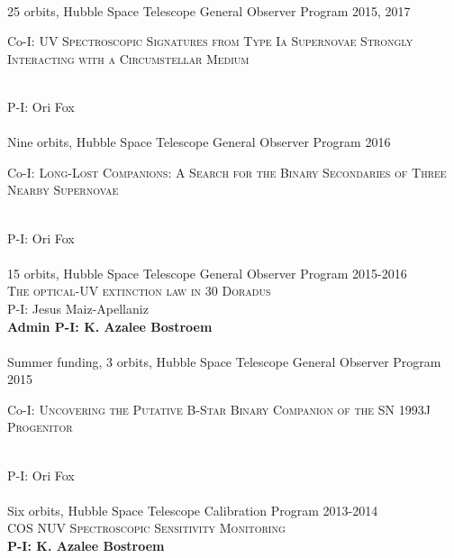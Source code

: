 \documentclass[10pt]{cv}
\begin{document}
\begin{llist}
\\
25 orbits, Hubble Space Telescope General Observer Program \hfill 2015, 2017\\ %
\begin{minipage}[l]{0.7\textwidth}\vspace{0.15cm}
Co-I: \textsc{UV Spectroscopic Signatures from Type Ia Supernovae Strongly Interacting with a Circumstellar Medium}
\end{minipage}\vspace{0.15cm}\\
P-I: Ori Fox \\
\\
Nine orbits, Hubble Space Telescope General Observer Program \hfill 2016\\ %
\begin{minipage}[l]{0.7\textwidth}\vspace{0.15cm}
Co-I: \textsc{Long-Lost Companions: A Search for the Binary Secondaries of Three Nearby Supernovae}
\end{minipage}\vspace{0.15cm}\\
P-I: Ori Fox \\
\\
15 orbits, Hubble Space Telescope General Observer Program \hfill 2015-2016\\ %
\textsc{The optical-UV extinction law in 30 Doradus}\\
P-I: Jesus Maiz-Apellaniz \\
{\bf Admin P-I: K. Azalee Bostroem} \\
\\
Summer funding, 3 orbits, Hubble Space Telescope General Observer Program \hfill 2015\\ %
\begin{minipage}[l]{0.7\textwidth}\vspace{0.15cm}
Co-I: \textsc{Uncovering the Putative B-Star Binary Companion of the SN 1993J Progenitor}
\end{minipage}\vspace{0.15cm}\\
P-I: Ori Fox \\
\\
Six orbits, Hubble Space Telescope Calibration Program \hfill 2013-2014\\ %
\textsc{COS NUV Spectroscopic Sensitivity Monitoring}\\
{\bf P-I: K. Azalee Bostroem} \\ %

\end{llist}
\end{document}
